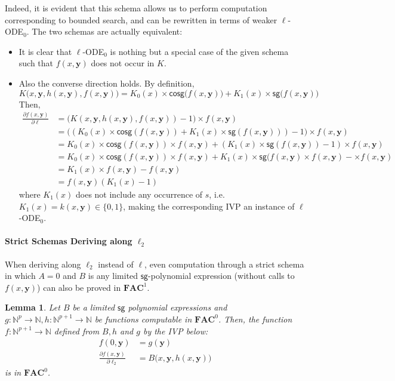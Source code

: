 \documentclass[11pt, oneside]{article}
\newcommand{\fun}[1]{\mathsf{#1}}
\newcommand{\sB}{B}
\newcommand{\Nat}{\mathbb{N}}
\newcommand{\AC}{\mathbf{FAC}}
\newcommand{\tu}[1]{\mathbf{#1}}
\newtheorem{lemma}{Lemma}
\theoremstyle{definition}
\begin{document}
{Indeed, it is evident that this schema allows us to perform computation corresponding to bounded search, and can be rewritten in terms of weaker $\ell$-ODE$_0$.
The two schemas are actually equivalent:
\begin{itemize}
    \itemsep0em
    \item It is clear that $\ell$-ODE$_0$ is nothing but a special case of the given schema such that $f(x, \tu y)$ does not occur in $K$.
    \item Also the converse direction holds.
    By definition, 
    $$
    K\big(x, \tu y, h(x, \tu y), f(x, \tu y)\big) = K_0(x) \times \fun{cosg}\big(f(x, \tu y)\big) + K_1(x) \times \fun{sg}\big(f(x, \tu y)\big) 
    $$
    Then,
    \begin{align*}
        \frac{\partial f(x,\tu y)}{\partial \ell} &= \big(K(x, \tu y, h(x, \tu y), f(x, \tu y)) - 1\big) \times f(x, \tu y) \\
        &= \big((K_0(x) \times \fun{cosg}(f(x, \tu y)) + K_1(x) \times \fun{sg}(f(x,\tu y)))-1\big) \times f(x, \tu y) \\
        &= K_0(x) \times \fun{cosg}(f(x, \tu y)) \times f(x, \tu y) + (K_1(x) \times \fun{sg}(f(x, \tu y))-1) \times f(x, \tu y) \\
        &= K_0(x) \times \fun{cosg}(f(x, \tu y)) \times f(x, \tu y) + K_1(x) \times \fun{sg}(f(x, \tu y)\times f(x, \tu y) - \times f(x, \tu y)
        \\
        &= K_1(x) \times f(x, \tu y) - f(x, \tu y) \\
        &= f(x, \tu y) (K_1(x)-1)
    \end{align*}
    where $K_1(x)$ does not include any occurrence of $s$, i.e. $K_1(x) = k(x, \tu y) \in \{0,1\}$, making the corresponding IVP an instance of $\ell$-ODE$_0$.
\end{itemize}

\paragraph{Strict Schemas Deriving along $\ell_2$}

When deriving along $\ell_2$ instead of $\ell$, even computation through a strict schema in which $A=0$ and $B$ is any limited $\fun{sg}$-polynomial expression (without calls to $f(x, \tu y)$) can also be proved in $\AC^1$.

\begin{lemma}\label{lemma:logitadd-original-3770}
    Let $\sB$ be a limited $\fun{sg}$ polynomial expressions and $g:\Nat^{p} \to \Nat, h:\Nat^{p+1}\to \Nat$ be functions computable in $\AC^0$.
    Then, the function $f:\Nat^{p+1} \to \Nat$ defined from $\sB, h$ and $g$ by the IVP below:
    \begin{align*}
        f(0, \tu y) &= g(\tu y) \\
        \frac{\partial f(x, \tu y)}{\partial \ell_2} &= \sB\big(x, \tu y, h(x, \tu y)\big)
    \end{align*}
    is in $\AC^0$.
\end{lemma}

}
\end{document}
